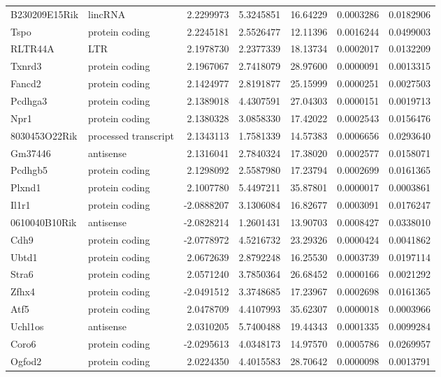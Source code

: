 \documentclass[onehalf,12pt]{beavtex}
\begin{document}
\begin{longtable}{llrrrrr}
  B230209E15Rik & lincRNA & 2.2299973 & 5.3245851 & 16.64229 & 0.0003286 & 0.0182906\\
  \addlinespace
  Tspo & protein coding & 2.2245181 & 2.5526477 & 12.11396 & 0.0016244 & 0.0499003\\
  RLTR44A & LTR & 2.1978730 & 2.2377339 & 18.13734 & 0.0002017 & 0.0132209\\
  Txnrd3 & protein coding & 2.1967067 & 2.7418079 & 28.97600 & 0.0000091 & 0.0013315\\
  Fancd2 & protein coding & 2.1424977 & 2.8191877 & 25.15999 & 0.0000251 & 0.0027503\\
  Pcdhga3 & protein coding & 2.1389018 & 4.4307591 & 27.04303 & 0.0000151 & 0.0019713\\
  \addlinespace
  Npr1 & protein coding & 2.1380328 & 3.0858330 & 17.42022 & 0.0002543 & 0.0156476\\
  8030453O22Rik & processed transcript & 2.1343113 & 1.7581339 & 14.57383 & 0.0006656 & 0.0293640\\
  Gm37446 & antisense & 2.1316041 & 2.7840324 & 17.38020 & 0.0002577 & 0.0158071\\
  Pcdhgb5 & protein coding & 2.1298092 & 2.5587980 & 17.23794 & 0.0002699 & 0.0161365\\
  Plxnd1 & protein coding & 2.1007780 & 5.4497211 & 35.87801 & 0.0000017 & 0.0003861\\
  \addlinespace
  Il1r1 & protein coding & -2.0888207 & 3.1306084 & 16.82677 & 0.0003091 & 0.0176247\\
  0610040B10Rik & antisense & -2.0828214 & 1.2601431 & 13.90703 & 0.0008427 & 0.0338010\\
  Cdh9 & protein coding & -2.0778972 & 4.5216732 & 23.29326 & 0.0000424 & 0.0041862\\
  Ubtd1 & protein coding & 2.0672639 & 2.8792248 & 16.25530 & 0.0003739 & 0.0197114\\
  Stra6 & protein coding & 2.0571240 & 3.7850364 & 26.68452 & 0.0000166 & 0.0021292\\
  \addlinespace
  Zfhx4 & protein coding & -2.0491512 & 3.3748685 & 17.23967 & 0.0002698 & 0.0161365\\
  Atf5 & protein coding & 2.0478709 & 4.4107993 & 35.62307 & 0.0000018 & 0.0003966\\
  Uchl1os & antisense & 2.0310205 & 5.7400488 & 19.44343 & 0.0001335 & 0.0099284\\
  Coro6 & protein coding & -2.0295613 & 4.0348173 & 14.97570 & 0.0005786 & 0.0269957\\
  Ogfod2 & protein coding & 2.0224350 & 4.4015583 & 28.70642 & 0.0000098 & 0.0013791\\

\end{longtable}
\end{document}
